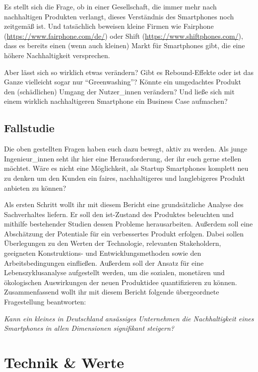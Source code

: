 \documentclass[DIV=15,headinclude=true]{scrartcl}
\begin{document}
Es stellt sich die Frage, ob in einer Gesellschaft, die immer mehr nach
nachhaltigen Produkten verlangt, dieses Verständnis des Smartphones noch
zeitgemäß ist. Und tatsächlich beweisen kleine Firmen wie Fairphone
(\url{https://www.fairphone.com/de/}) oder Shift
(\url{https://www.shiftphones.com/}), dass es bereits einen (wenn auch
kleinen) Markt für Smartphones gibt, die eine höhere Nachhaltigkeit
versprechen.

Aber lässt sich so wirklich etwas verändern? Gibt es Rebound-Effekte
oder ist das Ganze vielleicht sogar nur ``Greenwashing''? Könnte ein
umgedachtes Produkt den (schädlichen) Umgang der Nutzer\_innen
verändern? Und ließe sich mit einem wirklich nachhaltigeren Smartphone
ein Business Case aufmachen?

\subsection{Fallstudie}

Die oben gestellten Fragen haben euch dazu bewegt, aktiv zu werden. Als
junge Ingenieur\_innen seht ihr hier eine Herausforderung, der ihr euch
gerne stellen möchtet. Wäre es nicht eine Möglichkeit, als Startup
Smartphones komplett neu zu denken um den Kunden ein faires,
nachhaltigeres und langlebigeres Produkt anbieten zu können?

Als ersten Schritt wollt ihr mit diesem Bericht eine grundsätzliche
Analyse des Sachverhaltes liefern. Er soll den ist-Zustand des Produktes
beleuchten und mithilfe bestehender Studien dessen Probleme
herausarbeiten. Außerdem soll eine Abschätzung der Potentiale für ein
verbessertes Produkt erfolgen. Dabei sollen Überlegungen zu den Werten
der Technologie, relevanten Stakeholdern, geeigneten Konstruktions- und
Entwicklungsmethoden sowie den Arbeitsbedingungen einfließen. Außerdem
soll der Ansatz für eine Lebenszyklusanalyse aufgestellt werden, um die
sozialen, monetären und ökologischen Auswirkungen der neuen Produktidee
quantifizieren zu können. Zusammenfassend wollt ihr mit diesem Bericht
folgende übergeordnete Fragestellung beantworten:

\emph{Kann ein kleines in Deutschland ansässiges Unternehmen die
	Nachhaltigkeit eines Smartphones in allen Dimensionen signifikant
	steigern?}

\section{Technik \& Werte}
\end{document}

